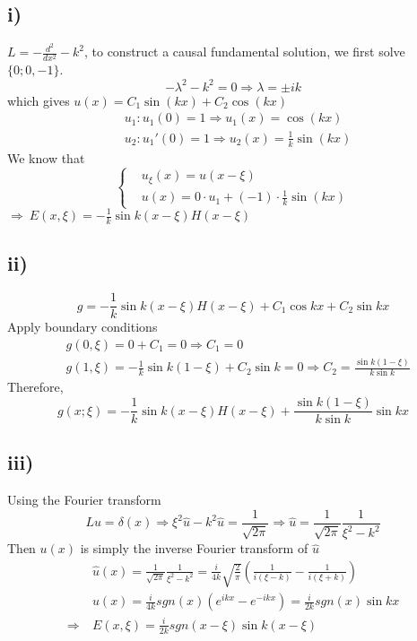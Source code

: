 \documentclass[a4paper, 11pt]{article}
\begin{document}
\begin{spacing}{1.5}
\subsection*{i)}
$L = -\frac{d^2}{dx^2} - k^2$, to construct a causal fundamental solution, we first solve $\{ 0;0,-1 \}$. \\
$$
    -\lambda^2 - k^2 = 0 \Rightarrow \lambda = \pm i k
$$
which gives $u(x) = C_1 \sin(kx) + C_2 \cos(kx) $
\begin{align*}
& u_1: u_1(0) = 1 \Rightarrow u_1(x) = \cos(kx) \\
& u_2: u_1'(0) = 1 \Rightarrow u_2(x) = \frac{1}{k} \sin(kx) 
\end{align*}
We know that
$$
\left\{
\begin{aligned}
& u_\xi(x) = u(x-\xi) \\
& u(x) = 0 \cdot u_1 + (-1) \cdot \frac{1}{k} \sin(kx)
\end{aligned}
\right.
$$
$\Rightarrow \  E(x,\xi) = -\frac{1}{k} \sin k(x-\xi) H(x-\xi)$

\subsection*{ii)}
$$
    g = -\frac{1}{k}  \sin k(x-\xi) H(x-\xi) + C_1\cos kx + C_2\sin kx
$$
Apply boundary conditions
\begin{align*}
& g(0,\xi) = 0+ C_1 = 0  \Rightarrow C_1=0\\
& g(1,\xi) = -\frac{1}{k} \sin k(1-\xi) + C_2\sin k = 0 \Rightarrow C_2 = \frac{\sin k(1-\xi)}{k \sin k}
\end{align*}
Therefore,
$$
    g(x;\xi) = -\frac{1}{k}  \sin k(x-\xi) H(x-\xi) + \frac{\sin k(1-\xi)}{k \sin k} \sin kx
$$

\subsection*{iii)}
Using the Fourier transform 
$$
    Lu = \delta(x) \Rightarrow \xi^2 \hat{u} - k^2 \hat{u} = \frac{1}{\sqrt{2\pi}} \Rightarrow \hat{u}=\frac{1}{\sqrt{2\pi}} \frac{1}{\xi^2 - k^2}
$$
Then $u(x)$ is simply the inverse Fourier transform of $\hat{u}$
\begin{align*}
& \hat{u}(x)  =\frac{1}{\sqrt{2\pi}} \frac{1}{\xi^2 - k^2} = \frac{i}{4k} \sqrt{\frac{2}{\pi}} \left( \frac{1}{i(\xi-k)} - \frac{1}{i(\xi+k)} \right) \\
& u(x) = \frac{i}{4k} sgn(x) \left( e^{ikx} -e^{-ikx} \right) = \frac{i}{2k} sgn(x) \sin kx \\
\Rightarrow \ & E(x,\xi) = \frac{i}{2k} sgn(x-\xi) \sin k(x-\xi)
\end{align*}



\end{spacing}
\end{document}

